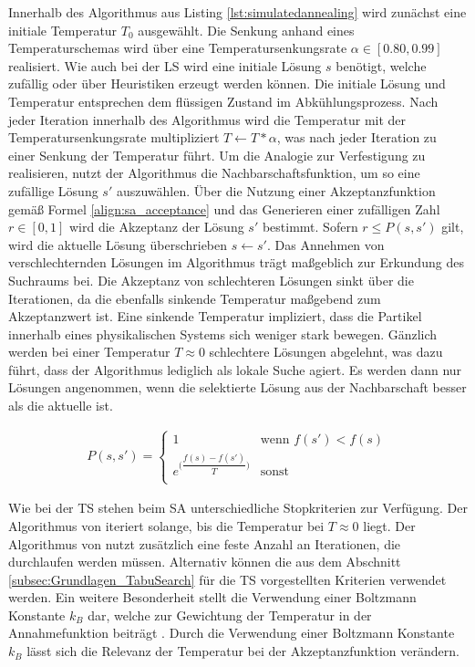 Innerhalb des Algorithmus aus Listing \ref{lst:simulatedannealing} wird zunächst eine initiale Temperatur $T_0$ ausgewählt. Die Senkung anhand eines Temperaturschemas wird über eine Temperatursenkungsrate $\alpha \in [0.80, 0.99]$ realisiert. Wie auch bei der \ac{LS} wird eine initiale Lösung $s$ benötigt, welche zufällig oder über Heuristiken erzeugt werden können. Die initiale Lösung und Temperatur entsprechen dem flüssigen Zustand im Abkühlungsprozess. Nach jeder Iteration innerhalb des Algorithmus wird die Temperatur mit der Temperatursenkungsrate multipliziert $T \leftarrow T * \alpha$, was nach jeder Iteration zu einer Senkung der Temperatur führt. Um die Analogie zur Verfestigung zu realisieren, nutzt der Algorithmus die Nachbarschaftsfunktion, um so eine zufällige Lösung $s'$ auszuwählen. Über die Nutzung einer Akzeptanzfunktion gemäß Formel \ref{align:sa_acceptance} \cite[vgl.][S. 6]{gendreau_handbook_2019} und das Generieren einer zufälligen Zahl $r \in [0, 1]$ wird die Akzeptanz der Lösung $s'$ bestimmt. Sofern $r \leq P(s, s')$ gilt, wird die aktuelle Lösung überschrieben $s \leftarrow s'$. Das Annehmen von verschlechternden Lösungen im Algorithmus trägt maßgeblich zur Erkundung des Suchraums bei. Die Akzeptanz von schlechteren Lösungen sinkt über die Iterationen, da die ebenfalls sinkende Temperatur maßgebend zum Akzeptanzwert ist. Eine sinkende Temperatur impliziert, dass die Partikel innerhalb eines physikalischen Systems sich weniger stark bewegen. Gänzlich werden bei einer Temperatur $T \approx 0$ schlechtere Lösungen abgelehnt, was dazu führt, dass der Algorithmus lediglich als lokale Suche agiert. Es werden dann nur Lösungen angenommen, wenn die selektierte Lösung aus der Nachbarschaft besser als die aktuelle ist. \cite[vgl.][S. 5 f.]{gendreau_handbook_2019} \cite[vgl.][S. 21 f.]{siarry_metaheuristics_2016} 

\begin{align}
P(s, s') = \left\{\begin{array}{ll} 
        1 & \text{wenn $f(s') < f(s)$} \\
        e^{\Big(\dfrac{f(s) - f(s')}{T}\Big)} & \text{sonst} \\
     \end{array}\right. \label{align:sa_acceptance}
\end{align}

Wie bei der \ac{TS} stehen beim \ac{SA} unterschiedliche Stopkriterien zur Verfügung. Der Algorithmus von \cite[][S. 6 f.]{gendreau_handbook_2019} iteriert solange, bis die Temperatur bei $T \approx 0$ liegt. Der Algorithmus von \cite[][S. 714]{hosseinabadi_novel_2017} nutzt zusätzlich eine feste Anzahl an Iterationen, die durchlaufen werden müssen. Alternativ können die aus dem Abschnitt \ref{subsec:Grundlagen_TabuSearch} für die \ac{TS} vorgestellten Kriterien verwendet werden. Ein weitere Besonderheit stellt die Verwendung einer Boltzmann Konstante $k_B$ dar, welche zur Gewichtung der Temperatur in der Annahmefunktion beiträgt \cite[vgl.][S. 21]{siarry_metaheuristics_2016}. Durch die Verwendung einer Boltzmann Konstante $k_B$ lässt sich die Relevanz der Temperatur bei der Akzeptanzfunktion verändern.  
